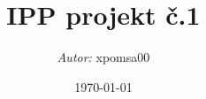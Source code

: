 \documentclass[a4paper,12pt]{article}
\title{IPP projekt č.1}
\author{\textit{Autor:} xpomsa00}
\date{\today}
\begin{document}
    \maketitle
    \newpage

    \begin{center}
        
    \end{center}
\end{document}
